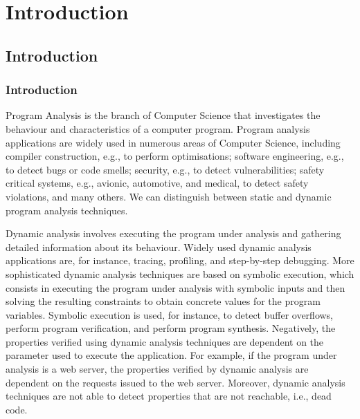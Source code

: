 \part{Introduction}
\chapter{Introduction}
\section{Introduction}

Program Analysis is the branch of Computer Science that investigates the behaviour
and characteristics of a computer program. Program analysis applications are widely
used in numerous areas of Computer Science, including compiler construction,
e.g., to perform optimisations; software engineering, e.g., to detect bugs or
code smells; security, e.g., to detect vulnerabilities; safety
critical systems, e.g., avionic, automotive, and medical, to detect safety
violations, and many others.
We can distinguish between static and dynamic program analysis techniques.

Dynamic analysis involves executing the program under analysis and gathering
detailed information about its behaviour. Widely used dynamic analysis applications
are, for instance, tracing, profiling, and step-by-step debugging. More sophisticated dynamic
analysis techniques are based on symbolic execution, which consists in executing
the program under analysis with symbolic inputs and then solving the resulting
constraints to obtain concrete values for the program variables. Symbolic execution
is used, for instance, to detect buffer overflows, perform program verification,
and perform program synthesis.
Negatively, the properties verified using dynamic analysis techniques 
are dependent on the parameter used to execute the application. For example, if the
program under analysis is a web server, the properties verified by dynamic analysis
are dependent on the requests issued to the web server. Moreover, dynamic analysis
techniques are not able to detect properties that are not reachable, i.e., dead code.


